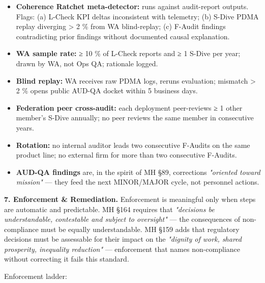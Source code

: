 \documentclass[11pt]{article}
\begin{document}
\begin{itemize}\setlength\itemsep{0pt}
\item \textbf{Coherence Ratchet meta-detector:} runs against audit-report outputs. Flags: (a) L-Check KPI deltas inconsistent with telemetry; (b) S-Dive PDMA replay diverging > 2 \% from WA blind-replay; (c) F-Audit findings contradicting prior findings without documented causal explanation.
\item \textbf{WA sample rate:} ≥ 10 \% of L-Check reports and ≥ 1 S-Dive per year; drawn by WA, not Ops QA; rationale logged.
\item \textbf{Blind replay:} WA receives raw PDMA logs, reruns evaluation; mismatch > 2 \% opens public AUD-QA docket within 5 business days.
\item \textbf{Federation peer cross-audit:} each deployment peer-reviews ≥ 1 other member's S-Dive annually; no peer reviews the same member in consecutive years.
\item \textbf{Rotation:} no internal auditor leads two consecutive F-Audits on the same product line; no external firm for more than two consecutive F-Audits.
\item \textbf{AUD-QA findings} are, in the spirit of MH §89, corrections \textit{"oriented toward mission"} — they feed the next MINOR/MAJOR cycle, not personnel actions.
\end{itemize}


\textbf{7. Enforcement \& Remediation.} Enforcement is meaningful only when steps are automatic and predictable. MH §164 requires that \textit{"decisions be understandable, contestable and subject to oversight"} — the consequences of non-compliance must be equally understandable. MH §159 adds that regulatory decisions must be assessable for their impact on the \textit{"dignity of work, shared prosperity, inequality reduction"} — enforcement that names non-compliance without correcting it fails this standard.


Enforcement ladder:
\end{document}
